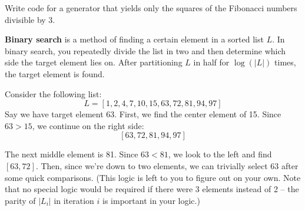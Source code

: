 \documentclass[addpoints]{exam}
\begin{document}
\begin{questions}

\question[15] Write code for a generator that yields only the squares of the Fibonacci numbers divisible by 3.


\newpage

\question \textbf{Binary search} is a method of finding a certain element in a sorted list $L$. In binary search, you repeatedly divide the list in two and then determine which side the target element lies on. After partitioning $L$ in half for $\log(|L|)$ times, the target element is found. 

Consider the following list: $$L = [1,2,4,7,10,15,63,72,81,94,97]$$ Say we have target element 63. First, we find the center element of 15. Since $63 > 15$, we continue on the right side: $$[63,72,81,94,97]$$

The next middle element is 81. Since $63 < 81$, we look to the left and find $[63,72]$. Then, since we're down to two elements, we can trivially select 63 after some quick comparisons. (This logic is left to you to figure out on your own. Note that no special logic would be required if there were 3 elements instead of 2 -- the parity of $|L_i|$ in iteration $i$ is important in your logic.)


\end{questions}
\end{document}
